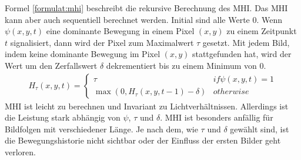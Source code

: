 \newline
\newline
Formel \ref{formulat:mhi} beschreibt die rekursive Berechnung des MHI. Das MHI kann aber auch sequentiell berechnet werden. Initial sind alle Werte 0. Wenn $\psi(x,y,t)$ eine dominante Bewegung in einem Pixel $(x,y)$
zu einem Zeitpunkt $t$ signalisiert, dann wird der Pixel zum Maximalwert $\tau$ gesetzt. Mit jedem Bild, indem keine dominante Bewegung im Pixel $(x,y)$ stattgefunden hat, wird der Wert um den
Zerfallswert $\delta$ dekrementiert bis zu einem Minimum von 0.
\begin{align}
    H_{\tau}(x,y,t) = \begin{cases}
                          \tau & if \psi(x,y,t) = 1 \\
                          \max(0, H_{\tau}(x,y,t-1) - \delta) & otherwise
    \end{cases}
    \label{formular:mhi}
\end{align}
MHI ist leicht zu berechnen und Invariant zu Lichtverhältnissen. Allerdings ist die Leistung stark abhängig von $\psi$, $\tau$ und $\delta$. MHI ist besonders anfällig für Bildfolgen mit verschiedener Länge.
Je nach dem, wie $\tau$ und $\delta$ gewählt sind, ist die Bewegungshistorie nicht sichtbar oder der Einfluss der ersten Bilder geht verloren.